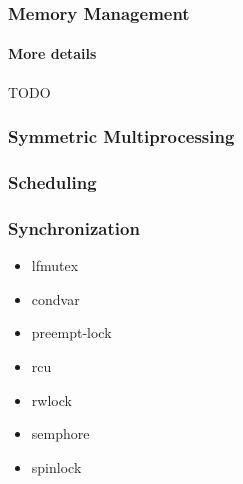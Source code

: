 \documentclass[10pt]{beamer}
\begin{document}
\begin{frame}
	\frametitle{Memory Management}
	\framesubtitle{More details}
		
\center
TODO

\end{frame}


\begin{frame}
	\frametitle{Symmetric Multiprocessing}
  
	
\end{frame}



\begin{frame}
	\frametitle{Scheduling}


\end{frame}



\begin{frame}
	\frametitle{Synchronization}
	\begin{itemize}
		\item lfmutex
		\item condvar
		\item preempt-lock
		\item rcu
		\item rwlock
		\item semphore
		\item spinlock
	\end{itemize}
\end{frame}
\end{document}
